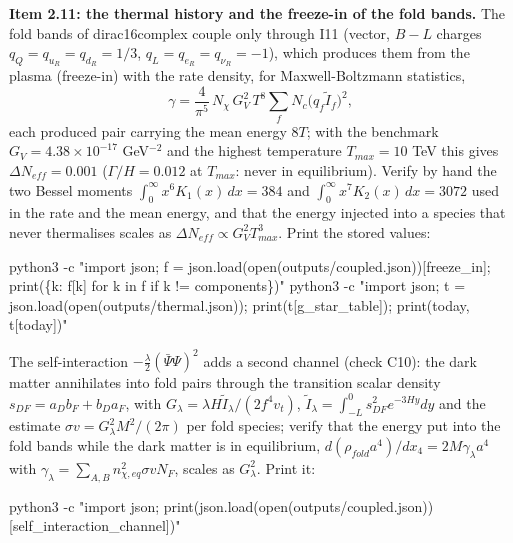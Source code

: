 \documentclass[
  10pt,
]{article}
\newenvironment{Shaded}{}{}
\newcommand{\NormalTok}[1]{#1}
\begin{document}
\textbf{Item 2.11: the thermal history and the freeze-in of the fold
bands.} The fold bands of dirac16complex couple only through I11
(vector, \(B - L\) charges \(q_Q = q_{u_R} = q_{d_R} = 1/3\),
\(q_L = q_{e_R} = q_{\nu_R} = -1\)), which produces them from the plasma
(freeze-in) with the rate density, for Maxwell-Boltzmann statistics,
\[ \gamma = \frac{4}{\pi^5}\,N_\chi\,G_V^2\,T^8\sum_fN_c\big(q_f\tilde I_f\big)^2, \]
each produced pair carrying the mean energy \(8T\); with the benchmark
\(G_V = 4.38\times10^{-17}\) GeV\(^{-2}\) and the highest temperature
\(T_{max} = 10\) TeV this gives \(\Delta N_{eff} = 0.001\)
(\(\Gamma/H = 0.012\) at \(T_{max}\): never in equilibrium). Verify by
hand the two Bessel moments \(\int_0^\infty x^6K_1(x)\,dx = 384\) and
\(\int_0^\infty x^7K_2(x)\,dx = 3072\) used in the rate and the mean
energy, and that the energy injected into a species that never
thermalises scales as \(\Delta N_{eff} \propto G_V^2T_{max}^3\). Print
the stored values:

\begin{Shaded}
\begin{Highlighting}[]
\NormalTok{python3 {-}c "import json; f = json.load(open(\textquotesingle{}outputs/coupled.json\textquotesingle{}))[\textquotesingle{}freeze\_in\textquotesingle{}]; print(\{k: f[k] for k in f if k != \textquotesingle{}components\textquotesingle{}\})"}
\NormalTok{python3 {-}c "import json; t = json.load(open(\textquotesingle{}outputs/thermal.json\textquotesingle{})); print(t[\textquotesingle{}g\_star\_table\textquotesingle{}]); print(\textquotesingle{}today\textquotesingle{}, t[\textquotesingle{}today\textquotesingle{}])"}
\end{Highlighting}
\end{Shaded}

The self-interaction \(-\frac{\lambda}{2}(\bar\Psi\Psi)^2\) adds a
second channel (check C10): the dark matter annihilates into fold pairs
through the transition scalar density \(s_{DF} = a_Db_F + b_Da_F\), with
\(G_\lambda = \lambda H\tilde I_\lambda/(2f^4v_t)\),
\(\tilde I_\lambda = \int_{-L}^0s_{DF}^2e^{-3Hy}dy\) and the estimate
\(\sigma v = G_\lambda^2M^2/(2\pi)\) per fold species; verify that the
energy put into the fold bands while the dark matter is in equilibrium,
\(d(\rho_{fold}a^4)/dx_4 = 2M\gamma_\lambda a^4\) with
\(\gamma_\lambda = \sum_{A,B}n_{\chi,eq}^2\sigma vN_F\), scales as
\(G_\lambda^2\). Print it:

\begin{Shaded}
\begin{Highlighting}[]
\NormalTok{python3 {-}c "import json; print(json.load(open(\textquotesingle{}outputs/coupled.json\textquotesingle{}))[\textquotesingle{}self\_interaction\_channel\textquotesingle{}])"}
\end{Highlighting}
\end{Shaded}
\end{document}

